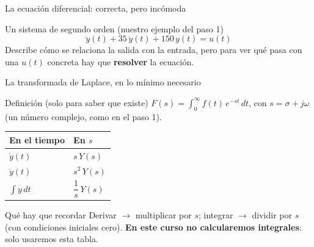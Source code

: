 \documentclass[aspectratio=169,11pt]{beamer}
\begin{document}
\begin{frame}{La ecuación diferencial: correcta, pero incómoda}
  \small
  \begin{block}{Un sistema de segundo orden (nuestro ejemplo del paso 1)}
    \[ \ddot y(t) + 35\,\dot y(t) + 150\,y(t) = u(t) \]
    Describe cómo se relaciona la salida con la entrada, pero para ver qué pasa con una $u(t)$ concreta hay que \textbf{resolver} la ecuación.
  \end{block}


\end{frame}

\begin{frame}{La transformada de Laplace, en lo mínimo necesario}
  \small
  \setlength{\parskip}{3pt}
  \begin{block}{Definición (solo para saber que existe)}
    $F(s)=\displaystyle\int_0^{\infty} f(t)\,e^{-st}\,dt$, \quad con \quad $s=\sigma+j\omega$ \quad (un número complejo, como en el paso 1).
  \end{block}

  \begin{center}
    \renewcommand{\arraystretch}{1.3}
    \begin{tabular}{ll}
      \hline
      \textbf{En el tiempo} & \textbf{En $s$} \\
      \hline
      $\dot y(t)$ & $s\,Y(s)$ \\
      $\ddot y(t)$ & $s^2\,Y(s)$ \\
      $\displaystyle\int y\,dt$ & $\dfrac{1}{s}\,Y(s)$ \\
      \hline
    \end{tabular}
  \end{center}

  \begin{block}{Qué hay que recordar}
    Derivar $\to$ multiplicar por $s$; integrar $\to$ dividir por $s$ (con condiciones iniciales cero). \textbf{En este curso no calcularemos integrales}: solo usaremos esta tabla.
  \end{block}
\end{frame}
\end{document}
